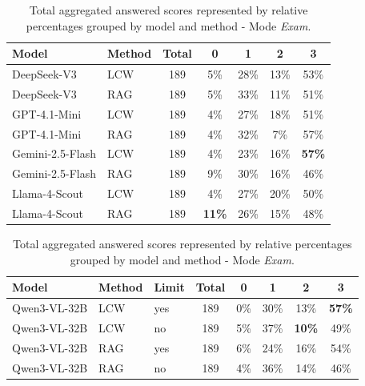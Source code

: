 \begin{table}[H]
    \centering
    \caption[Correctness - Answered - Percentage Rates - \textit{Exam} Mode]{Total aggregated answered scores represented by relative percentages grouped by model and method - Mode \textit{Exam}.}
    \label{tab:total_exam_rates_answered}
    
    \begin{threeparttable}
        \small
        \setlength{\tabcolsep}{8pt}
        \begin{tabular}{llccccc}
            \toprule
            \textbf{Model} & \textbf{Method} & \textbf{Total} & \textbf{0} & \textbf{1} & \textbf{2} & \textbf{3} \\
            \midrule
            DeepSeek-V3 & LCW & 189 & 5\% & 28\% & 13\% & 53\% \\
            \rowcolor{gray!10} DeepSeek-V3 & RAG & 189 & 5\% & 33\% & 11\% & 51\% \\
            \addlinespace
            GPT-4.1-Mini & LCW & 189 & 4\% & 27\% & 18\% & 51\% \\
            \rowcolor{gray!10} GPT-4.1-Mini & RAG & 189 & 4\% & 32\% & 7\% & 57\% \\
            \addlinespace
            Gemini-2.5-Flash & LCW & 189 & 4\% & 23\% & 16\% & \textbf{57\%} \\
            \rowcolor{gray!10} Gemini-2.5-Flash & RAG & 189 & 9\% & 30\% & 16\% & 46\% \\
            \addlinespace
            Llama-4-Scout & LCW & 189 & 4\% & 27\% & 20\% & 50\% \\
            \rowcolor{gray!10} Llama-4-Scout & RAG & 189 & \textbf{11\%} & 26\% & 15\% & 48\% \\
            \bottomrule
        \end{tabular}
    \end{threeparttable}

    \vspace{1.5em}
    
    \begin{threeparttable}
        \small
        \setlength{\tabcolsep}{8pt}
        \begin{tabular}{lllccccc}
            \toprule
            \textbf{Model} & \textbf{Method} & \textbf{Limit} & \textbf{Total} & \textbf{0} & \textbf{1} & \textbf{2} & \textbf{3} \\
            \midrule
            Qwen3-VL-32B & LCW & yes & 189 & 0\% & 30\% & 13\% & \textbf{57\%} \\
            Qwen3-VL-32B & LCW & no & 189 & 5\% & 37\% & \textbf{10\%} & 49\% \\
            \rowcolor{gray!10} Qwen3-VL-32B & RAG & yes & 189 & 6\% & 24\% & 16\% & 54\% \\
            \rowcolor{gray!10} Qwen3-VL-32B & RAG & no & 189 & 4\% & 36\% & 14\% & 46\% \\
            \bottomrule
        \end{tabular}
        

\end{threeparttable}
\end{table}
